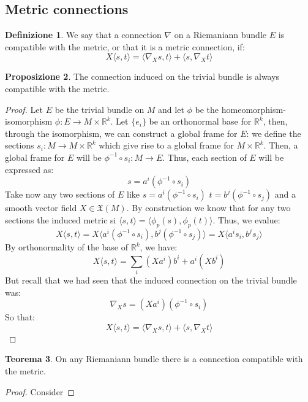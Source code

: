 \documentclass[12pt,a4paper]{report}
\theoremstyle{definition}
\newtheorem{Def}{Definizione}[chapter]
\theoremstyle{Theorem}
\newtheorem{Theo}[Def]{Teorema}
\newtheorem{Prop}[Def]{Proposizione}
\theoremstyle{definition}
\theoremstyle{definition}
\theoremstyle{definition}
\begin{document}
	\subsection{Metric connections}
	\begin{Def}\label{Def_5.9}
		We say that a connection $\nabla$ on a Riemaniann bundle $E$ is compatible with the metric, or that it is a metric connection, if:
		$$X\langle s,t\rangle =\langle \nabla_X s,t\rangle+\langle s,\nabla_X t\rangle$$
	\end{Def}
	\begin{Prop}
		The connection induced on the trivial bundle is always compatible with the metric.
	\end{Prop}
	\begin{proof}
		Let $E$ be the trivial bundle on $M$ and let $\phi$ be the homeomorphism-isomorphism $\phi:E\rightarrow M\times \mathbb{R}^k$.
		Let $\{e_i\}$ be an orthonormal base for $\mathbb{R}^k$, then, through the isomorphism, we can construct a global frame for $E$: we define the sections $s_i:M\rightarrow M\times \mathbb{R}^k$ which give rise to a global frame for $M\times \mathbb{R}^k$. Then, a global frame for $E$ will be $\phi^{-1}\circ s_i:M\rightarrow E$.
		Thus, each section of $E$ will be expressed as: 
		$$s=a^i(\phi^{-1}\circ s_i)$$
		Take now any two sections of $E$ like $s=a^i(\phi^{-1}\circ s_i)$ $t=b^j(\phi^{-1}\circ s_j)$ and a smooth vector field $X\in\mathfrak{X}(M)$. By construction we know that for any two sections the induced metric si $\langle s,t\rangle=\langle \phi_p(s),\phi_p(t)\rangle$. Thus, we evalue:
		$$X\langle s,t\rangle=X\langle a^i(\phi^{-1}\circ s_i),b^j(\phi^{-1}\circ s_j)\rangle =X\langle a^i s_i,b^js_j\rangle $$
		By orthonormality of the base of $\mathbb{R}^k$, we have:
		$$X\langle s,t\rangle=\sum_i (Xa^i)b^i+a^i(Xb^i)$$
		But recall that we had seen that the induced connection on the trivial bundle was: 
		$$\nabla_X s=(Xa^i)(\phi^{-1}\circ s_i)$$
		So that:
		$$X\langle s,t\rangle=\langle \nabla_Xs,t\rangle+\langle s,\nabla_Xt\rangle$$
	\end{proof}
	\begin{Theo}
		On any Riemaniann bundle there is a connection compatible with the metric.
	\end{Theo}
	\begin{proof}
		Consider
	\end{proof}
\end{document}
